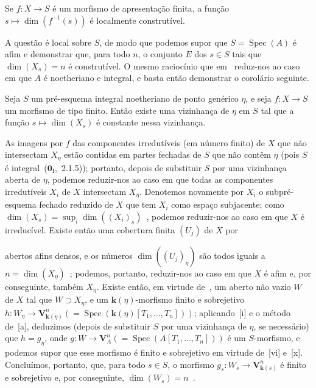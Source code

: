 \begin{proposition}[9.2.6.1]
\label{IV.9.2.6.1}
Se $f:X\to S$ é um morfismo de apresentação finita, a função $s\mapsto\dim(f^{-1}(s))$ é localmente construtível.
\end{proposition}

A questão é local sobre $S$, de modo que podemos supor que $S=\operatorname{Spec}(A)$ é afim e demonstrar que, para todo $n$, o conjunto $E$ dos $s\in S$ tais que $\dim(X_s)=n$ é construtível.
O mesmo raciocínio que em~ reduz-nos ao caso em que $A$ é noetheriano e integral, e basta então demonstrar o corolário seguinte.

\begin{corollary}[9.2.6.2]
\label{IV.9.2.6.2}
Seja $S$ um pré-esquema integral noetheriano de ponto genérico $\eta$, e seja $f:X\to S$ um morfismo de tipo finito.
Então existe uma vizinhança de $\eta$ em $S$ tal que a função $s\mapsto\dim(X_s)$ é constante nessa vizinhança.
\end{corollary}

As imagens por $f$ das componentes irredutíveis (em número finito) de $X$ que não intersectam $X_\eta$ estão contidas em partes fechadas de $S$ que não contêm $\eta$ (pois $S$ é integral~($\mathbf{0}_{\mathrm{I}}$,~2.1.5)); portanto, depois de substituir $S$ por uma vizinhança aberta de $\eta$, podemos reduzir-nos ao caso em que todas as componentes irredutíveis $X_i$ de $X$ intersectam $X_\eta$.
Denotemos novamente por $X_i$ o subpré-esquema fechado reduzido de $X$ que tem $X_i$ como espaço subjacente; como $\dim(X_s)=\sup_i\dim((X_i)_s)$~, podemos reduzir-nos ao caso em que $X$ é irreducível.
Existe então uma cobertura finita $(U_j)$ de $X$ por

abertos afins densos, e os números $\dim((U_j)_\eta)$ são todos iguais a $n=\dim(X_\eta)$~; podemos, portanto, reduzir-nos ao caso em que $X$ é afim e, por conseguinte, também $X_\eta$.
Existe então, em virtude de~, um aberto não vazio $W$ de $X$ tal que $W\supset X_\eta$, e um $\mathbf{k}(\eta)$-morfismo finito e sobrejetivo $h:W_\eta\to\mathbf{V}_{\mathbf{k}(\eta)}^n(=\operatorname{Spec}(\mathbf{k}(\eta)[T_1,\ldots,T_n]))$; aplicando~[i] e o método de~[a], deduzimos (depois de substituir $S$ por uma vizinhança de $\eta$, se necessário) que $h=g_\eta$, onde $g:W\to\mathbf{V}_A^n(=\operatorname{Spec}(A[T_1,\ldots,T_n]))$ é um $S$-morfismo, e podemos supor que esse morfismo é finito e sobrejetivo em virtude de~[vi] e~[x].
Concluímos, portanto, que, para todo $s\in S$, o morfismo $g_s:W_s\to\mathbf{V}_{\mathbf{k}(s)}^n$ é finito e sobrejetivo e, por conseguinte, $\dim(W_s)=n$~.

